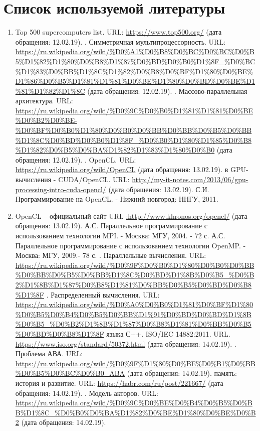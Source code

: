 { %
	\section*{Список используемой литературы}
	\begin{enumerate}
		\sloppy
		 В.В., Балакшин П.В. Введение в параллельные вычисления. – СПб: Университет ИТМО, 2016. – 51 с.
		\item Top 500 supercomputers list. URL: \url{https://www.top500.org/} (дата обращения: 12.02.19).
		. Симметричная мультипроцессорность. URL: \url{https://ru.wikipedia.org/wiki/%D0%A1%D0%B8%D0%BC%D0%BC%D0%B5%D1%82%D1%80%D0%B8%D1%87%D0%BD%D0%B0%D1%8F_%D0%BC%D1%83%D0%BB%D1%8C%D1%82%D0%B8%D0%BF%D1%80%D0%BE%D1%86%D0%B5%D1%81%D1%81%D0%BE%D1%80%D0%BD%D0%BE%D1%81%D1%82%D1%8C} (дата обращения: 12.02.19).
		. Массово-параллельная архитектура. URL: \url{https://ru.wikipedia.org/wiki/%D0%9C%D0%B0%D1%81%D1%81%D0%BE%D0%B2%D0%BE-%D0%BF%D0%B0%D1%80%D0%B0%D0%BB%D0%BB%D0%B5%D0%BB%D1%8C%D0%BD%D0%B0%D1%8F_%D0%B0%D1%80%D1%85%D0%B8%D1%82%D0%B5%D0%BA%D1%82%D1%83%D1%80%D0%B0} (дата обращения: 12.02.19).
		. OpenCL. URL: \url{https://ru.wikipedia.org/wiki/OpenCL} (дата обращения: 13.02.19).
		 в GPU-вычисления - CUDA/OpenCL. URL: \url{http://my-it-notes.com/2013/06/gpu-processing-intro-cuda-opencl/} (дата обращения: 13.02.19).
		 С.И. Программирование на OpenCL. - Нижний новгород: ННГУ, 2011.
		\item OpenCL – официальный сайт URL \url{:http://www.khronos.org/opencl/} (дата обращения: 13.02.19).
		 А.С. Параллельное программирование с использованием технологии MPI. - Москва: МГУ, 2004. - 72 с.
		 А.С. Параллельное программирование с использованием технологии OpenMP. - Москва: МГУ, 2009.- 78 с.
		. Параллельные вычисления. URL: \url{https://ru.wikipedia.org/wiki/%D0%9F%D0%B0%D1%80%D0%B0%D0%BB%D0%BB%D0%B5%D0%BB%D1%8C%D0%BD%D1%8B%D0%B5_%D0%B2%D1%8B%D1%87%D0%B8%D1%81%D0%BB%D0%B5%D0%BD%D0%B8%D1%8F}
		. Распределенный вычисления. URL: \url{https://ru.wikipedia.org/wiki/%D0%A0%D0%B0%D1%81%D0%BF%D1%80%D0%B5%D0%B4%D0%B5%D0%BB%D1%91%D0%BD%D0%BD%D1%8B%D0%B5_%D0%B2%D1%8B%D1%87%D0%B8%D1%81%D0%BB%D0%B5%D0%BD%D0%B8%D1%8F}
		 языка С++. ISO/IEC 14882:2011. URL. \url{https://www.iso.org/standard/50372.html} (дата обращения: 14.02.19).
		. Проблема АВА. URL: \url{https://ru.wikipedia.org/wiki/%D0%9F%D1%80%D0%BE%D0%B1%D0%BB%D0%B5%D0%BC%D0%B0_ABA} (дата обращения: 14.02.19).
		 память: история и развитие. URL: \url{https://habr.com/ru/post/221667/} (дата обращения: 14.02.19).
		. Модель акторов. URL: \url{https://ru.wikipedia.org/wiki/%D0%9C%D0%BE%D0%B4%D0%B5%D0%BB%D1%8C_%D0%B0%D0%BA%D1%82%D0%BE%D1%80%D0%BE%D0%B2} (дата обращения: 14.02.19).
	\end{enumerate}
}